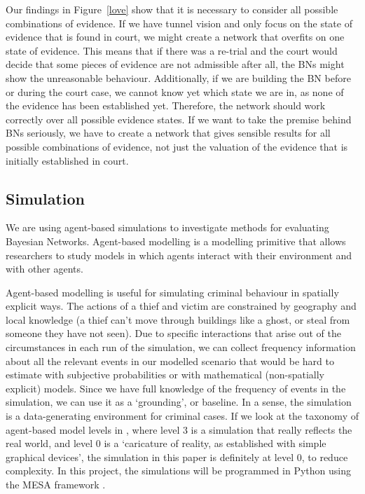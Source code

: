 \documentclass[11pt]{article}
\begin{document}
Our findings in Figure~\ref{love} show that it is necessary to consider all possible combinations of evidence. If we have tunnel vision and only focus on the state of evidence that is found in court, we might create a network that overfits on one state of evidence. This means that if there was a re-trial and the court would decide that some pieces of evidence are not admissible after all, the BNs might show the unreasonable behaviour. Additionally, if we are building the BN before or during the court case, we cannot know yet which state we are in, as none of the evidence has been established yet. Therefore, the network should work correctly over all possible evidence states. If we want to take the premise behind BNs seriously, we have to create a network that gives sensible results for all possible combinations of evidence, not just the valuation of the evidence that is initially established in court.

\subsection{Simulation}

We are using agent-based simulations to investigate methods for evaluating Bayesian Networks. Agent-based modelling is a modelling primitive that allows researchers to study models in which agents interact with their environment and with other agents\citep{gilbert2000}. 

Agent-based modelling is useful for simulating criminal behaviour in spatially explicit ways. The actions of a thief and victim are constrained by geography and local knowledge (a thief can't move through buildings like a ghost, or steal from someone they have not seen). Due to specific interactions that arise out of the circumstances in each run of the simulation, we can collect frequency information about all the relevant events in our modelled scenario that would be hard to estimate with subjective probabilities or with mathematical (non-spatially explicit) models. Since we have full knowledge of the frequency of events in the simulation, we can use it as a `grounding', or baseline. In a sense, the simulation is a data-generating environment for criminal cases. If we look at the taxonomy of agent-based model levels in \citep{gilbert2005}, where level 3 is a simulation that really reflects the real world, and level 0 is a `caricature of reality, as established with simple graphical devices', the simulation in this paper is definitely at level 0, to reduce complexity. In this project, the simulations will be programmed in Python using the MESA framework  \citep{mesa2020}.
\end{document}
